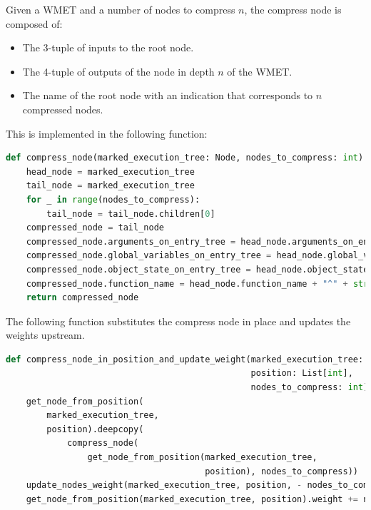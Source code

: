Given a WMET and a number of nodes to compress \(n\), the compress node is composed of:
\begin{itemize}
    \item The 3-tuple of inputs to the root node.
    \item The 4-tuple of outputs of the node in depth \(n\) of the WMET.
    \item The name of the root node with an indication that corresponds to \(n\) compressed nodes.
\end{itemize}
This is implemented in the following function:
\begin{lstlisting}[language=Python, caption=Compression node]
def compress_node(marked_execution_tree: Node, nodes_to_compress: int) -> Node:
    head_node = marked_execution_tree
    tail_node = marked_execution_tree
    for _ in range(nodes_to_compress):
        tail_node = tail_node.children[0]
    compressed_node = tail_node
    compressed_node.arguments_on_entry_tree = head_node.arguments_on_entry_tree
    compressed_node.global_variables_on_entry_tree = head_node.global_variables_on_entry_tree
    compressed_node.object_state_on_entry_tree = head_node.object_state_on_entry_tree
    compressed_node.function_name = head_node.function_name + "^" + str(nodes_to_compress + 1)
    return compressed_node
\end{lstlisting}

The following function substitutes the compress node in place and updates the weights upstream.
\begin{lstlisting}[language=Python, caption=How to determine if a buggy node has been found]
def compress_node_in_position_and_update_weight(marked_execution_tree: Node,
                                                position: List[int],
                                                nodes_to_compress: int) -> None:
    get_node_from_position(
        marked_execution_tree,
        position).deepcopy(
            compress_node(
                get_node_from_position(marked_execution_tree,
                                       position), nodes_to_compress))
    update_nodes_weight(marked_execution_tree, position, - nodes_to_compress)
    get_node_from_position(marked_execution_tree, position).weight += nodes_to_compress
\end{lstlisting}
